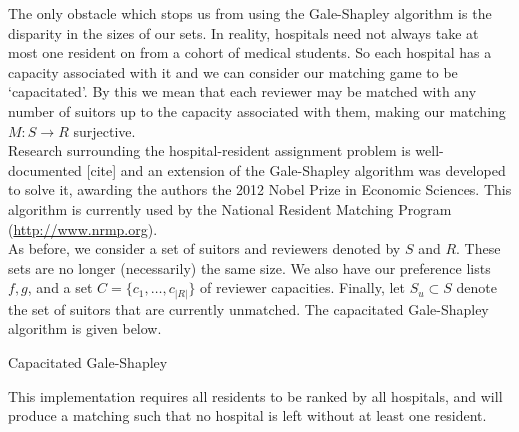 The only obstacle which stops us from using the Gale-Shapley algorithm is the 
disparity in the sizes of our sets. In reality, hospitals need not always take 
at most one resident on from a cohort of medical students. So each hospital has
a capacity associated with it and we can consider our matching game to be
`capacitated'. By this we mean that each reviewer may be matched with any number
of suitors up to the capacity associated with them, making our matching \(M: S 
\to R\) surjective. \\

Research surrounding the hospital-resident assignment problem is well-documented 
[cite] and an extension of the Gale-Shapley algorithm was developed to solve it,
awarding the authors the 2012 Nobel Prize in Economic Sciences. This algorithm
is currently used by the National Resident Matching Program 
(\url{http://www.nrmp.org}). \\

As before, we consider a set of suitors and reviewers denoted by \(S\) and 
\(R\). These sets are no longer (necessarily) the same size. We also have our 
preference lists \(f, g\), and a set \(C = \{c_1, \ldots, c_{|R|}\}\) of 
reviewer capacities. Finally, let \(S_u \subset S\) denote the set of suitors 
that are currently unmatched. The capacitated Gale-Shapley algorithm is given 
below.

\begin{algorithm}[H]
\caption{Capacitated Gale-Shapley}\label{alg:cap-galeshapley}
    \begin{algorithmic}[0]
	    \EndFor
	    \EndFor
		    \Else
		        \Else
				            \Else
				            \EndIf
			            \EndIf
			        \EndFor
		        \EndIf
		    \EndIf
	    \EndWhile
	\end{algorithmic}
\end{algorithm}

\begin{remark}
	This implementation requires all residents to be ranked by all hospitals, 
    and will produce a matching such that no hospital is left without at least 
    one resident.
\end{remark}

